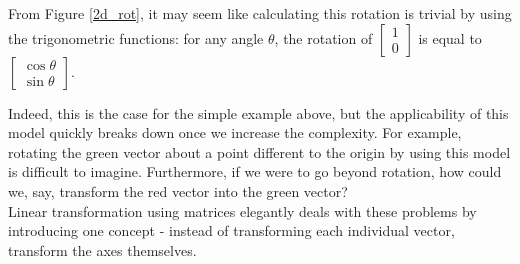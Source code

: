 \documentclass[12pt, a4paper]{article}
\begin{document}
From Figure \ref{2d_rot}, it may seem like calculating this rotation is trivial
by using the trigonometric functions: for any angle $\theta$, the rotation of
$\begin{bmatrix}1 \\ 0\end{bmatrix}$ is equal to $\begin{bmatrix}\cos\theta \\
\sin\theta\end{bmatrix}$. \vspace{0.2cm}

Indeed, this is the case for the simple example above, but the applicability of
this model quickly breaks down once we increase the complexity. For example,
rotating the green vector about a point different to the origin by using this
model is difficult to imagine. Furthermore, if we were to go beyond rotation,
how could we, say, transform the red vector into the green vector? \\

Linear transformation using matrices elegantly deals with these problems by
introducing one concept - instead of transforming each individual vector,
transform the axes themselves. \\
\end{document}
